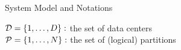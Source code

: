 
\begin{frame}{System Model and Notations}
  \begin{center}
    $\mathcal{D} = \{1, \dots, D\}:$ the set of data centers \\[3pt]

    $\mathcal{P} = \{1, \dots, N\}:$ the set of (logical) partitions


  \end{center}
\end{frame}






